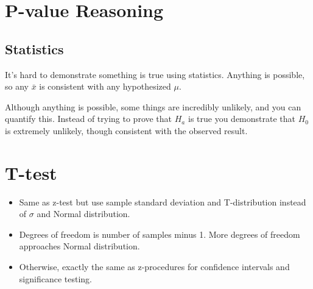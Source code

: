 \documentclass[letterpaper, landscape]{exam}
\begin{document}
  \section{P-value Reasoning} %

  \subsection{Statistics} %
  
  It's hard to demonstrate something is true using statistics. Anything is
  possible, so any $\bar{x}$ is consistent with any hypothesized $\mu$.
  
  Although anything is possible, some things are incredibly unlikely, and you
  can quantify this. Instead of trying to prove that $H_a$ is true you
  demonstrate that $H_0$ is extremely unlikely, though consistent with the
  observed result.

  


  


  \section{T-test} %

  \begin{itemize}
    \item Same as z-test but use sample standard deviation and T-distribution
      instead of $\sigma$ and Normal distribution.

    \item Degrees of freedom is number of samples minus 1. More degrees of
      freedom approaches Normal distribution.

    \item Otherwise, exactly the same as z-procedures for confidence intervals
      and significance testing.

  \end{itemize}
\end{document}
